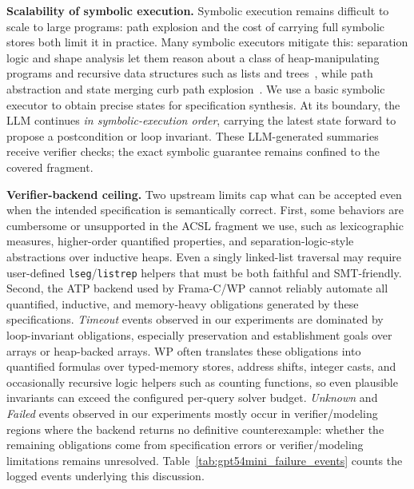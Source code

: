 \smallskip
\noindent\textbf{Scalability of symbolic execution.}
Symbolic execution remains difficult to scale to large programs: path explosion
and the cost of carrying full symbolic stores both limit it in practice. Many symbolic executors mitigate this: separation
logic and shape analysis let them reason about a class of heap-manipulating
programs and recursive data structures such as lists and
trees~\cite{calcagno2009compositional}, while path abstraction
and state merging curb path explosion~\cite{kuznetsov2012merging,avgerinos2014veritesting}.
We use a basic symbolic executor to obtain precise states for specification synthesis. At its boundary, the LLM continues \emph{in symbolic-execution order}, carrying the latest state forward to propose a postcondition or loop invariant. These LLM-generated summaries receive verifier checks; the exact symbolic guarantee remains confined to the covered fragment.


\smallskip
\noindent\textbf{Verifier-backend ceiling.}
Two upstream limits cap what can be accepted even when the intended
specification is semantically correct. First, some behaviors are cumbersome or
unsupported in the ACSL fragment we use, such as lexicographic measures,
higher-order quantified properties, and separation-logic-style abstractions
over inductive heaps. Even a singly linked-list traversal may require
user-defined \texttt{lseg}/\texttt{listrep} helpers that must be both faithful
and SMT-friendly. Second, the ATP backend used by Frama-C/WP cannot reliably
automate all quantified, inductive, and memory-heavy obligations generated by
these specifications. 
\emph{Timeout} events observed in our experiments are dominated by loop-invariant obligations, especially
preservation and establishment goals over arrays or heap-backed arrays. 
WP often translates these obligations into
quantified formulas over typed-memory stores, address shifts, integer casts, and
occasionally recursive logic helpers such as counting functions, so even
plausible invariants can exceed the configured per-query solver budget.
\emph{Unknown} and \emph{Failed} events observed in our experiments mostly occur
in verifier/modeling regions where the backend returns no definitive
counterexample: whether the remaining obligations come from specification
errors or verifier/modeling limitations remains unresolved.
Table~\ref{tab:gpt54mini_failure_events} counts the logged events underlying
this discussion.

